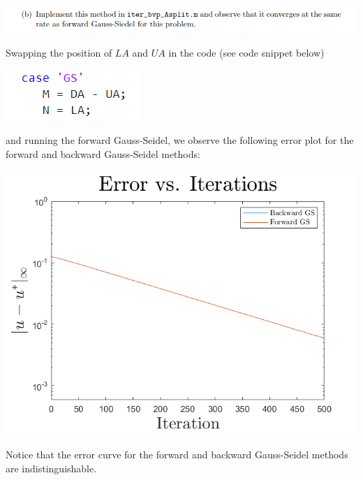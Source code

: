 \documentclass{article}
\begin{document}
\includegraphics[scale = 0.8]{ex4.2b.PNG}
\newline

Swapping the position of $LA$ and $UA$ in the code (see code snippet below) 
\begin{center}
    \includegraphics{forwardGS.PNG}
\end{center}
and running the forward Gauss-Seidel, we observe the following error plot for the forward and backward Gauss-Seidel methods:
\begin{center}
    \includegraphics[scale = 0.6]{forward_backward_GS.png}
\end{center}
Notice that the error curve for the forward and backward Gauss-Seidel methods are indistinguishable.
\newline
\end{document}
